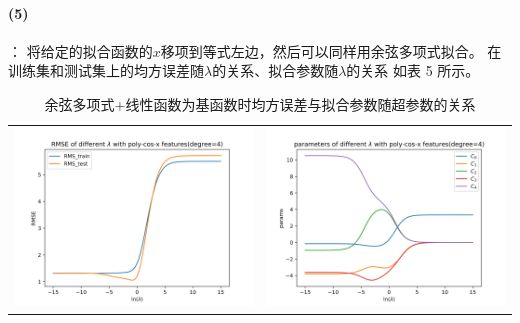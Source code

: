 \documentclass[a4paper,zihao=5,UTF8]{ctexart}
\begin{document}
    \paragraph{(5)}：
    将给定的拟合函数的$x$移项到等式左边，然后可以同样用余弦多项式拟合。
    在训练集和测试集上的均方误差随$\lambda$的关系、拟合参数随$\lambda$的关系
    如表 5 所示。
    \begin{table}[htbp]
        \centering
        \begin{tabular}[htbp]{cc}
            \includegraphics[scale=0.5]{RMSE_poly-cos-x.png} & \includegraphics[scale=0.5]{Params_poly-cos-x.png} \\
        \end{tabular}
        \caption{余弦多项式+线性函数为基函数时均方误差与拟合参数随超参数的关系}
    \end{table}
\end{document}
